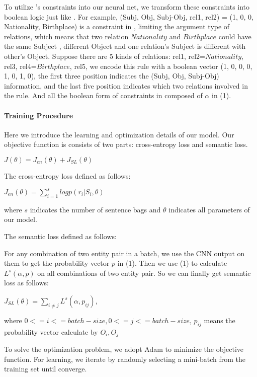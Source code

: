 To utilize \cite{chen2014encoding}'s constraints into our neural net, we transform these constraints into boolean logic just like \cite{xu2017semantic}. For example, (Subj, Obj, Subj-Obj, rel1, rel2) = (1, 0, 0, Nationality, Birthplace) is a constraint in \cite{chen2014encoding}, limiting the argument type of relations, which means that two relation $ Nationality $ and $ Birthplace $ could have the same Subject , different Object and one relation's Subject is different with other's Object. Suppose there are 5 kinds of relations: rel1, rel2=$ Nationality $, rel3, rel4=$ Birthplace $, rel5, we encode this rule with a boolean vector (1, 0, 0, 0, 1, 0, 1, 0), the first three position indicates the (Subj, Obj, Subj-Obj) information, and the last five position indicates which two relations involved in the rule. And all the boolean form of constraints in \cite{chen2014encoding} composed of  $ \alpha $ in (1).

\paragraph{Training Procedure}
Here we introduce the learning and optimization details of our model. Our objective function is consists of two parts: cross-entropy loss and semantic loss.
\begin{center}
	$ J(\theta) = J_{en}(\theta) + J_{SL}(\theta)$
\end{center}

The cross-entropy loss defined as follows:
\begin{center}
	$ J_{en}(\theta)= \sum\limits_{i=1}^{s}logp(r_i|S_i, \theta)$	
\end{center}
where $ s $ indicates the number of sentence bags and $ \theta $ indicates all parameters of our model.

The semantic loss defined as follows:

For any combination of two entity pair in a batch, we use the CNN output on them to get the probability vector $ p $ in (1). Then we use (1) to calculate $L^{s}(\alpha, p)$ on all combinations of two entity pair. So we can finally get semantic loss as follows:
\begin{center}
	$ J_{SL}(\theta) = \sum\limits_{i \neq j}L^{s}(\alpha, p_{ij}) $,
\end{center}
where $0<=i<=batch-size, 0<=j<=batch-size$, $ p_{ij} $ means the probability vector calculate by $ O_i, O_j $

To solve the optimization problem, we adopt Adam \cite{kingma2014adam} to minimize the objective function. For learning, we iterate by randomly selecting a mini-batch from the training set until converge.
